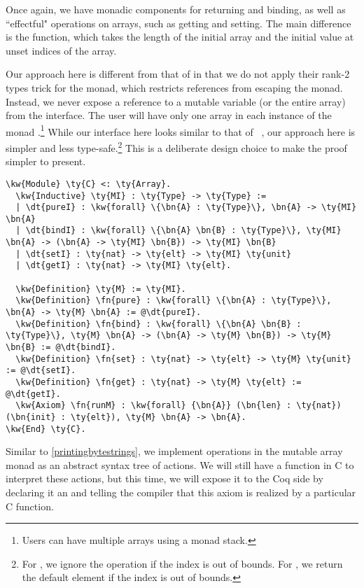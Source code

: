 Once again, we have monadic components for returning and binding, as well as ``effectful" operations on arrays, such as getting and setting. The main difference is the  function, which takes the length of the initial array and the initial value at unset indices of the array.

Our approach here is different from that of \citeauthor{launcybury1994lazy} in that we do not apply their rank-2 types trick for the  monad, which restricts references from escaping the monad. Instead, we never expose a reference to a mutable variable (or the entire array) from the interface. The user will have only one array in each instance of the monad .\footnote{Users can have multiple arrays using a monad stack.} While our interface here looks similar to that of \citeauthor{sakaguchi2020program}~\cite{sakaguchi2020program}, our approach here is simpler and less type-safe.\footnote{For , we ignore the operation if the index is out of bounds. For , we return the default element if the index is out of bounds.} This is a deliberate design choice to make the proof simpler to present.

\begin{Verbatim}
\kw{Module} \ty{C} <: \ty{Array}.
  \kw{Inductive} \ty{MI} : \ty{Type} -> \ty{Type} :=
  | \dt{pureI} : \kw{forall} \{\bn{A} : \ty{Type}\}, \bn{A} -> \ty{MI} \bn{A}
  | \dt{bindI} : \kw{forall} \{\bn{A} \bn{B} : \ty{Type}\}, \ty{MI} \bn{A} -> (\bn{A} -> \ty{MI} \bn{B}) -> \ty{MI} \bn{B}
  | \dt{setI} : \ty{nat} -> \ty{elt} -> \ty{MI} \ty{unit}
  | \dt{getI} : \ty{nat} -> \ty{MI} \ty{elt}.

  \kw{Definition} \ty{M} := \ty{MI}.
  \kw{Definition} \fn{pure} : \kw{forall} \{\bn{A} : \ty{Type}\}, \bn{A} -> \ty{M} \bn{A} := @\dt{pureI}.
  \kw{Definition} \fn{bind} : \kw{forall} \{\bn{A} \bn{B} : \ty{Type}\}, \ty{M} \bn{A} -> (\bn{A} -> \ty{M} \bn{B}) -> \ty{M} \bn{B} := @\dt{bindI}.
  \kw{Definition} \fn{set} : \ty{nat} -> \ty{elt} -> \ty{M} \ty{unit} := @\dt{setI}.
  \kw{Definition} \fn{get} : \ty{nat} -> \ty{M} \ty{elt} := @\dt{getI}.
  \kw{Axiom} \fn{runM} : \kw{forall} {\bn{A}} (\bn{len} : \ty{nat}) (\bn{init} : \ty{elt}), \ty{M} \bn{A} -> \bn{A}.
\kw{End} \ty{C}.
\end{Verbatim}

Similar to \autoref{printingbytestrings}, we implement operations in the mutable array monad as an abstract syntax tree of actions. We will still have a  function in C to interpret these actions, but this time, we will expose it to the Coq side by declaring it an  and telling the compiler that this axiom is realized by a particular C function.

